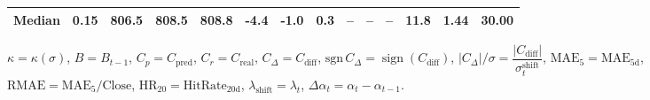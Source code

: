 \begin{threeparttable}
{\begin{tabular}{lrrrrrrrrrrrrr}
 Median &     0.15 & 806.5 & 808.5 & 808.8 &       -4.4 &                     -1.0 &                 0.3 &         -- &        -- &             -- &             11.8 &            1.44 &                  30.00 \\
\bottomrule
\end{tabular}
}
\begin{tablenotes}\footnotesize
\item $\kappa=\kappa(\sigma)$, $B=B_{t-1}$, $C_p=C_{\text{pred}}$, $C_r=C_{\text{real}}$, $C_\Delta=C_{\text{diff}}$, $\mathrm{sgn}\,C_\Delta=\operatorname{sign}(C_{\text{diff}})$, $|C_\Delta|/\sigma=\dfrac{|C_{\text{diff}}|}{\sigma_t^{\text{shift}}}$, $\mathrm{MAE}_5=\mathrm{MAE}_{5\text{d}}$, $\mathrm{RMAE}= \mathrm{MAE}_5 / \text{Close}$, $\mathrm{HR}_{20}=\mathrm{HitRate}_{20\text{d}}$, 
$\lambda_{\text{shift}}=\lambda_t$, 
$\Delta\alpha_t=\alpha_t-\alpha_{t-1}$.
\end{tablenotes}
\end{threeparttable}
\endgroup
